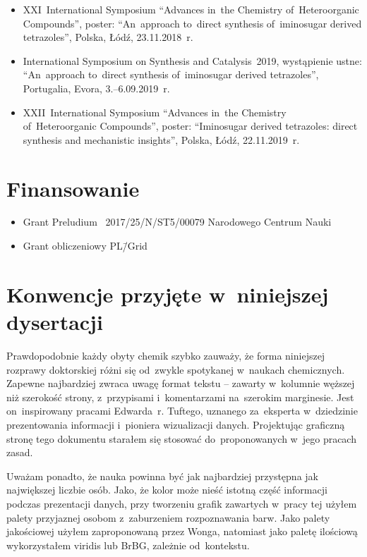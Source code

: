 \begin{fullwidth}
\begin{itemize}
  \item XXI~International Symposium \enquote{Advances in~the Chemistry of~Heteroorganic Compounds}, poster: \enquote{An~approach to~direct synthesis of~iminosugar derived tetrazoles}, Polska, Łódź, 23.11.2018~r.
  \item International Symposium on Synthesis and Catalysis~2019, wystąpienie ustne: \enquote{An~approach to~direct synthesis of~iminosugar derived tetrazoles}, Portugalia, Evora, 3.\-–6.09.2019~r.
  \item XXII~International Symposium \enquote{Advances in~the Chemistry of~Heteroorganic Compounds}, poster: \enquote{Iminosugar derived tetrazoles: direct synthesis and mechanistic insights}, Polska, Łódź, 22.11.2019~r.
\end{itemize}
\end{fullwidth}

\section{Finansowanie}
\begin{fullwidth}
\begin{itemize}
  \item Grant Preludium \textnumero~2017/25/N/ST5/00079 Narodowego Centrum Nauki
  \item Grant obliczeniowy PL\=/Grid
\end{itemize}
\end{fullwidth}


\section{Konwencje przyjęte w~niniejszej dysertacji}

Prawdopodobnie każdy obyty chemik szybko zauważy, że forma niniejszej rozprawy doktorskiej różni się od~zwykle spotykanej w~naukach chemicznych.
Zapewne najbardziej zwraca uwagę format tekstu \--- zawarty w~kolumnie węższej niż szerokość strony, z~przypisami i~komentarzami na~szerokim marginesie.
Jest on~inspirowany pracami\autocite{Tufte2001,Tufte1990,Tufte1997,Tufte2006} Edwarda~r. Tuftego,
uznanego za~eksperta w~dziedzinie prezentowania informacji i~pioniera wizualizacji danych\autocite{Yaffa2011}.
Projektując graficzną stronę tego dokumentu starałem się stosować do~proponowanych w~jego pracach zasad.

Uważam ponadto, że nauka powinna być jak najbardziej przystępna jak największej liczbie osób.
Jako, że kolor może nieść istotną część informacji podczas prezentacji danych,
przy tworzeniu grafik zawartych w~pracy tej użyłem palety przyjaznej osobom z~zaburzeniem rozpoznawania barw.
Jako palety jakościowej użyłem zaproponowaną przez Wonga\autocite{wong11},
natomiast jako paletę ilościową wykorzystałem viridis\autocite{Smith2015} lub BrBG, zależnie od~kontekstu.

